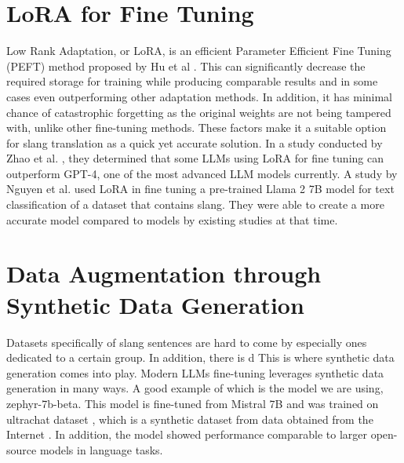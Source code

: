 \section{LoRA for Fine Tuning}
Low Rank Adaptation, or LoRA, is an efficient Parameter Efficient Fine Tuning (PEFT) method proposed by Hu et al \cite{hu2021loralowrankadaptationlarge}.
This can significantly decrease the required storage for training while producing comparable results and in some cases even outperforming other adaptation methods.
In addition, it has minimal chance of catastrophic forgetting as the original weights are not being tampered with, unlike other fine-tuning methods.
These factors make it a suitable option for slang translation as a quick yet accurate solution.
In a study conducted by Zhao et al. \cite{zhao2024loraland310finetuned}, they determined that some LLMs using LoRA for fine tuning can outperform GPT-4, one of the most advanced LLM models currently.
A study by Nguyen et al. \cite{nguyen2023finetuningllama2large} used LoRA in fine tuning a pre-trained Llama 2 7B model for text classification of a dataset that contains slang.
They were able to create a more accurate model compared to models by existing studies at that time. 

\section{Data Augmentation through Synthetic Data Generation}
Datasets specifically of slang sentences are hard to come by especially ones dedicated to a certain group. In addition, there is d This is where synthetic data generation comes into play.  Modern LLMs fine-tuning leverages synthetic data generation in many ways. A good example of which is the model we are using, zephyr-7b-beta. This model is fine-tuned from Mistral 7B and was trained on ultrachat dataset \cite{cui2023ultrafeedback}, which is a synthetic dataset from data obtained from the Internet \cite{ding2023enhancing}. In addition, the model showed performance comparable to larger open-source models in language tasks. 

